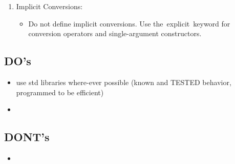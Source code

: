 \begin{enumerate}
	\item Implicit Conversions:
	\begin{itemize}
		\item Do not define implicit conversions. Use the explicit keyword for conversion operators and single-argument constructors.
	\end{itemize}
	
\end{enumerate}

\subsection{DO's}
\begin{itemize}
	\item use std libraries where-ever possible (known and TESTED behavior, programmed to be efficient)
	\item 
\end{itemize}

\subsection{DONT's}

\begin{itemize}
	\item 
\end{itemize}